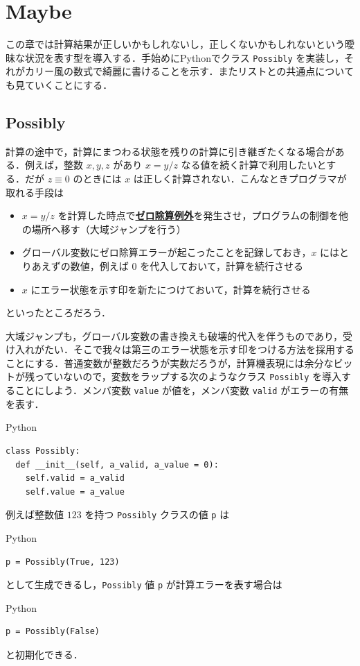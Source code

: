 \documentclass[a4paper,twocolumn]{jsbook}
\newcommand{\programminglanguage}[1]{\textsf{#1}}
\newcommand{\python}{\programminglanguage{Python}}
\newenvironment{leader}{\begingroup\gt}{\endgroup}
\newcommand{\keyword}[1]{{\underline{\textbf{#1}}}}
\newcommand{\code}[1]{\texttt{#1}}
\newenvironment{pythoncode}{\begin{itembox}[r]{\python}}{\end{itembox}}
\begin{document}
\chapter{Maybe}

\begin{leader}
この章では計算結果が正しいかもしれないし，正しくないかもしれないという曖昧な状況を表す型を導入する．手始めに\python でクラス \code{Possibly} を実装し，それがカリー風の数式で綺麗に書けることを示す．またリストとの共通点についても見ていくことにする．
\end{leader}

\section{Possibly}

計算の途中で，計算にまつわる状態を残りの計算に引き継ぎたくなる場合がある．例えば，整数 $x,y,z$ があり $x=y/z$ なる値を続く計算で利用したいとする．だが $z\equiv0$ のときには $x$ は正しく計算されない．こんなときプログラマが取れる手段は
\begin{itemize}
\item $x=y/z$ を計算した時点で\keyword{ゼロ除算例外}を発生させ，プログラムの制御を他の場所へ移す（大域ジャンプを行う）
\item グローバル変数にゼロ除算エラーが起こったことを記録しておき，$x$ にはとりあえずの数値，例えば $0$ を代入しておいて，計算を続行させる
\item $x$ にエラー状態を示す印を新たにつけておいて，計算を続行させる
\end{itemize}
といったところだろう．

大域ジャンプも，グローバル変数の書き換えも破壊的代入を伴うものであり，受け入れがたい．そこで我々は第三のエラー状態を示す印をつける方法を採用することにする．普通変数が整数だろうが実数だろうが，計算機表現には余分なビットが残っていないので，変数をラップする次のようなクラス \code{Possibly} を導入することにしよう．メンバ変数 \code{value} が値を，メンバ変数 \code{valid} がエラーの有無を表す．
\begin{pythoncode}
\begin{verbatim}
class Possibly:
  def __init__(self, a_valid, a_value = 0):
    self.valid = a_valid
    self.value = a_value
\end{verbatim}
\end{pythoncode}

例えば整数値 $123$ を持つ \code{Possibly} クラスの値 \code{p} は
\begin{pythoncode}
\begin{verbatim}
p = Possibly(True, 123)
\end{verbatim}
\end{pythoncode}
として生成できるし，\code{Possibly} 値 \code{p} が計算エラーを表す場合は
\begin{pythoncode}
\begin{verbatim}
p = Possibly(False)
\end{verbatim}
\end{pythoncode}
と初期化できる．
\end{document}
